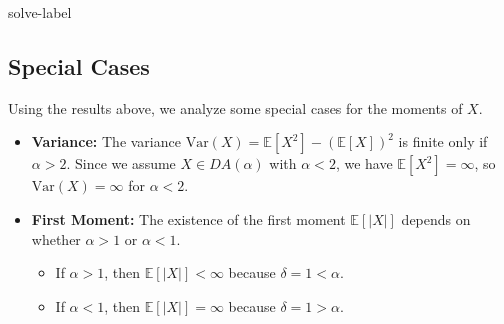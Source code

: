 \begin{solve}{}{solve-label}
\subsection*{Special Cases}

Using the results above, we analyze some special cases for the moments of \( X \).

\begin{itemize}
	\item \textbf{Variance:} The variance \( \mathrm{Var}(X) = \mathbb{E}[X^2] - (\mathbb{E}[X])^2 \) is finite only if \( \alpha > 2 \). Since we assume \( X \in DA(\alpha) \) with \( \alpha < 2 \), we have \( \mathbb{E}[X^2] = \infty \), so \( \mathrm{Var}(X) = \infty \) for \( \alpha < 2 \).
	
	\item \textbf{First Moment:} The existence of the first moment \( \mathbb{E}[|X|] \) depends on whether \( \alpha > 1 \) or \( \alpha < 1 \).
	\begin{itemize}
		\item If \( \alpha > 1 \), then \( \mathbb{E}[|X|] < \infty \) because \( \delta = 1 < \alpha \).
		\item If \( \alpha < 1 \), then \( \mathbb{E}[|X|] = \infty \) because \( \delta = 1 > \alpha \).
	\end{itemize}
\end{itemize}
 \cite{r1,r2,r3,r4,r5,r6,r7}
	\end{solve}
	
	
	
	
	
